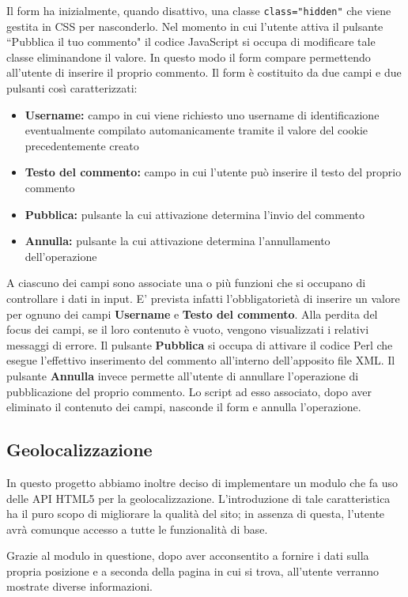 Il form ha inizialmente, quando disattivo, una classe \texttt{class="hidden"} 
che viene gestita in CSS per nasconderlo. Nel momento in cui l'utente attiva il pulsante
``Pubblica il tuo commento" il codice JavaScript si occupa di modificare tale classe
eliminandone il valore. In questo modo il form compare permettendo all'utente
di inserire il proprio commento. 
Il form è costituito da due campi e due pulsanti così caratterizzati:
\begin{itemize}
\item \textbf{Username:} campo in cui viene richiesto uno username di identificazione
eventualmente compilato automanicamente tramite il valore del cookie precedentemente creato
\item \textbf{Testo del commento:} campo in cui l'utente può inserire il testo del proprio commento
\item \textbf{Pubblica:} pulsante la cui attivazione determina l'invio del commento
\item \textbf{Annulla:}  pulsante la cui attivazione determina l'annullamento dell'operazione
\end{itemize}
A ciascuno dei campi sono associate una o più funzioni che si occupano di controllare i dati
in input. E' prevista infatti l'obbligatorietà di inserire un valore per ognuno dei campi 
\textbf{Username} e \textbf{Testo del commento}. Alla perdita del focus dei campi, se il loro contenuto è vuoto, vengono visualizzati i relativi messaggi di errore.
Il pulsante \textbf{Pubblica} si occupa di attivare il codice Perl che esegue l'effettivo
inserimento del commento all'interno dell'apposito file XML. Il pulsante \textbf{Annulla} invece permette all'utente di annullare l'operazione di pubblicazione del proprio commento.
Lo script ad esso associato, dopo aver eliminato il contenuto dei campi, nasconde il form e
annulla l'operazione.

\subsection{Geolocalizzazione}
In questo progetto abbiamo inoltre deciso di implementare un modulo che fa uso
delle API HTML5 per la geolocalizzazione. L'introduzione di tale
caratteristica ha il puro scopo di migliorare la qualità del sito; in assenza
di questa, l'utente avrà comunque accesso a tutte le funzionalità di base.
\begin{flushleft}
Grazie al modulo in questione, dopo aver acconsentito a fornire i dati sulla
propria posizione e a seconda della pagina in cui si trova, all'utente
verranno mostrate diverse informazioni.
\end{flushleft}

